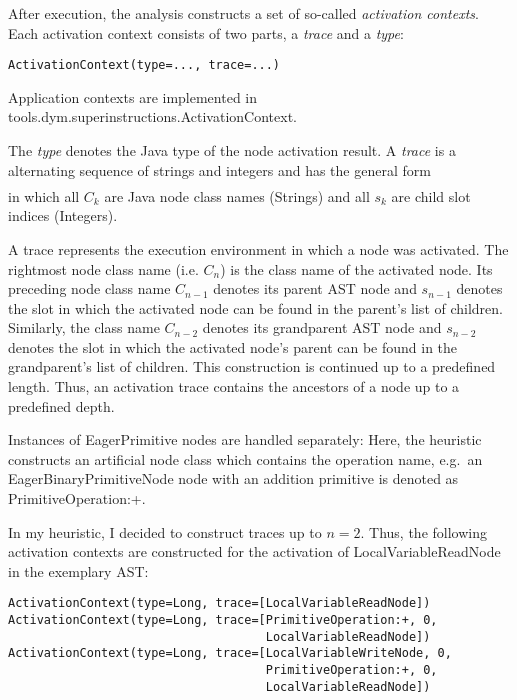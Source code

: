 \documentclass[10pt,a4paper]{article}
\begin{document}
After execution, the analysis constructs a set of so-called \emph{activation contexts}. Each activation context consists of two parts, a \emph{trace} and a \emph{type}:
\begin{verbatim}
ActivationContext(type=..., trace=...)
\end{verbatim}

Application contexts are implemented in \textsf{tools.dym.superinstructions.{\allowbreak}ActivationContext}.

The \emph{type} denotes the Java type of the node activation result. A \emph{trace} is a alternating sequence of strings and integers and has the general form
\begin{align*}
[ C_0, s_0, C_1, ..., s_{n - 1}, C_{n}]
\end{align*}
in which all $C_k$ are Java node class names (Strings) and all $s_k$ are child slot indices (Integers).

A trace represents the execution environment in which a node was activated. The rightmost node class name (i.e. $C_n$) is the class name of the activated node. Its preceding node class name $C_{n-1}$ denotes its parent AST node and $s_{n-1}$ denotes the slot in which the activated node can be found in the parent's list of children. Similarly, the class name $C_{n-2}$ denotes its grandparent AST node and $s_{n-2}$ denotes the slot in which the activated node's parent can be found in the grandparent's list of children. This construction is continued up to a predefined length. Thus, an activation trace contains the ancestors of a node up to a predefined depth.

Instances of \textsf{EagerPrimitive} nodes are handled separately: Here, the heuristic constructs an artificial node class which contains the operation name, e.g.\ an \textsf{EagerBinaryPrimitiveNode} node with an addition primitive is denoted as \textsf{PrimitiveOperation:+}.

In my heuristic, I decided to construct traces up to $n=2$. Thus, the following activation contexts are constructed for the activation of \textsf{LocalVariableReadNode} in the exemplary AST:

\begin{verbatim}
ActivationContext(type=Long, trace=[LocalVariableReadNode])
ActivationContext(type=Long, trace=[PrimitiveOperation:+, 0,
                                    LocalVariableReadNode])
ActivationContext(type=Long, trace=[LocalVariableWriteNode, 0,
                                    PrimitiveOperation:+, 0,
                                    LocalVariableReadNode])
\end{verbatim}
\end{document}
